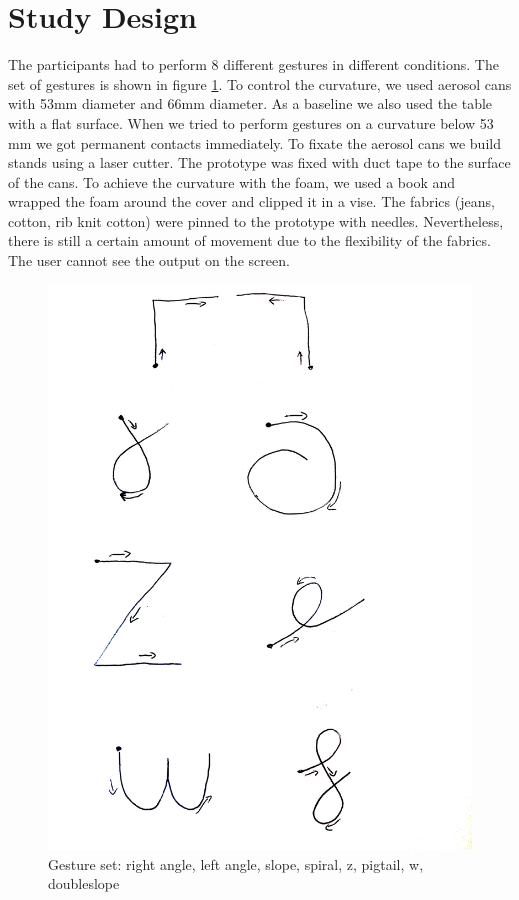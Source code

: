 \section{Study Design}
The participants had to perform 8 different gestures in different conditions. The set of gestures is shown in figure \ref{fig:gestureTemplate}. To control the curvature, we used aerosol cans with 53mm diameter and 66mm diameter. As a baseline we also used the table with a flat surface. When we tried to perform gestures on a curvature below 53 mm we got permanent contacts immediately. To fixate the aerosol cans we build stands using a laser cutter. The prototype was fixed with duct tape to the surface of the cans. To achieve the curvature with the foam, we used a book and wrapped the foam around the cover and clipped it in a vise. The fabrics (jeans, cotton, rib knit cotton) were pinned to the prototype with needles. Nevertheless, there is still a certain amount of movement due to the flexibility of the fabrics. The user cannot see the output on the screen. \\
\begin{center}
\begin{figure}
\includegraphics[scale=0.07]{images/gestureTemplate.jpg}
\caption{Gesture set: right angle, left angle, slope, spiral, z, pigtail, w, doubleslope}
\label{fig:gestureTemplate}
\end{figure}
\end{center}
